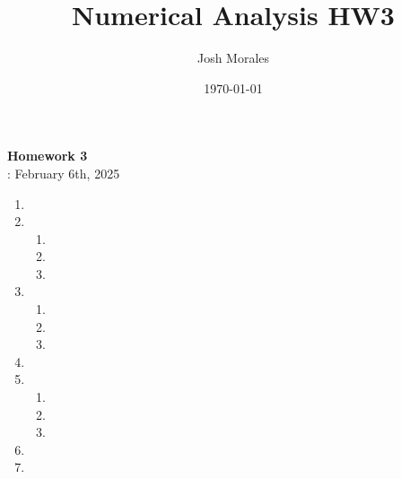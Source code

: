 \documentclass[12pt]{article}
\title{Numerical Analysis HW3}
\author{Josh Morales}
\date{\today}
\begin{document}
\pagestyle{fancy}
\begin{center}
\textbf{\Large Homework 3} \\
: February 6th, 2025
\end{center}
\begin{enumerate}[leftmargin=2em]
    \item

    \item 
    \begin{enumerate}
        \item[(a)]
        
        \item[(b)]
        
        \item[(c)]  
    \end{enumerate}


    \item
    \begin{enumerate}
        \item[(a)] 
        
        \item[(b)]
        
        \item[(c)]
    \end{enumerate}
    
    \item 

    \item
    \begin{enumerate}
        \item[(a)]

        \item[(b)]
        
        \item[(c)]
    \end{enumerate}

    \item

    \item
\end{enumerate}
\end{document}
